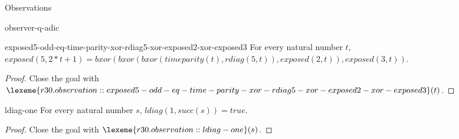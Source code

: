 \begin{lexlean}{Observations}
\begin{section}{observer-q-adic}
\begin{theorem}{exposed5-odd-eq-time-parity-xor-rdiag5-xor-exposed2-xor-exposed3}
For every natural number \(t\), \(exposed(5, 2 * t + 1) = bxor(bxor(bxor(timeparity(t), rdiag(5, t)), exposed(2, t)), exposed(3, t))\).
\begin{proof}
Close the goal with \(\lexeme{r30.observation::exposed5-odd-eq-time-parity-xor-rdiag5-xor-exposed2-xor-exposed3}(t)\).
\end{proof}
\end{theorem}

\begin{theorem}{ldiag-one}
For every natural number \(s\), \(ldiag(1, succ(s)) = true\).
\begin{proof}
Close the goal with \(\lexeme{r30.observation::ldiag-one}(s)\).
\end{proof}
\end{theorem}

\end{section}
\end{lexlean}
